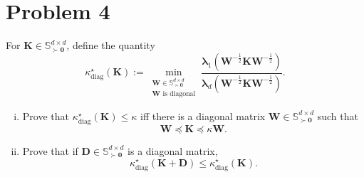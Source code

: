\section*{Problem 4}

For $\mathbf{K} \in \mathbb{S}^{d \times d}_{\succ \mathbf{0}}$, define the quantity
\[
\kappa^\star_{\mathrm{diag}}(\mathbf{K}) := \min_{\substack{\mathbf{W} \in \mathbb{S}^{d \times d}_{\succ \mathbf{0}} \\ \mathbf{W} \text{ is diagonal}}} \frac{\boldsymbol{\lambda}_1\left(\mathbf{W}^{-\frac{1}{2}} \mathbf{K} \mathbf{W}^{-\frac{1}{2}}\right)}{\boldsymbol{\lambda}_d\left(\mathbf{W}^{-\frac{1}{2}} \mathbf{K} \mathbf{W}^{-\frac{1}{2}}\right)}.
\]

\begin{enumerate}[(i)]
\item Prove that $\kappa^\star_{\mathrm{diag}}(\mathbf{K}) \le \kappa$ iff there is a diagonal matrix $\mathbf{W} \in \mathbb{S}^{d \times d}_{\succ \mathbf{0}}$ such that
\[
\mathbf{W} \preceq \mathbf{K} \preceq \kappa \mathbf{W}.
\]

\item Prove that if $\mathbf{D} \in \mathbb{S}^{d \times d}_{\succ \mathbf{0}}$ is a diagonal matrix,
\[
\kappa^\star_{\mathrm{diag}}(\mathbf{K} + \mathbf{D}) \le \kappa^\star_{\mathrm{diag}}(\mathbf{K}).
\]
\end{enumerate}
